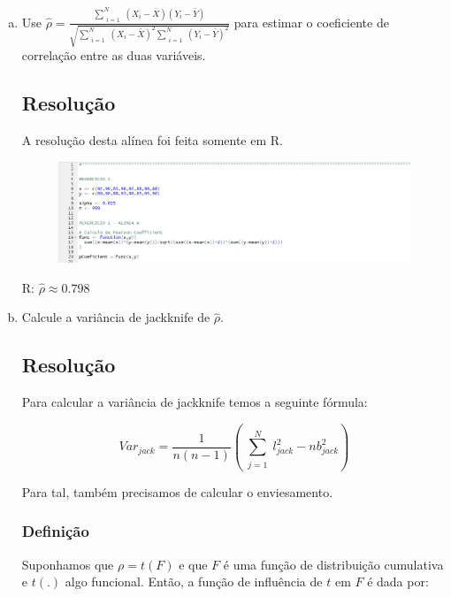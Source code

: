 \documentclass{article}
\begin{document}
			 \begin{enumerate}[(a)]
				\item Use $\hat{\rho} = 
				\frac{\sum_{\substack{i=1}}^{N} (X_i - \bar X)(Y_i - \bar Y)}										{\sqrt{\sum_{\substack{i=1}}^{N}(X_i - \bar X)^2 														\sum_{\substack{i=1}}^{N}(Y_i - \bar Y)^2}}$	
			para estimar o coeficiente de \indent \indent correlação entre as duas variáveis.
			
				\subsection*{Resolução}
					A resolução desta alínea foi feita somente em R.
					
					\begin{figure}[!h]
						\includegraphics[scale=0.70]{ex1a)}
					\end{figure}

				R: $\hat{\rho} \approx 0.798$
			
				\item Calcule a variância de jackknife de $\hat{\rho}$.
				
				\subsection*{Resolução}	
					Para calcular a variância de jackknife temos a seguinte fórmula:
					
					\begin{equation*}
						Var_{jack} = \frac{1}{n(n-1)}(\sum_{\substack{j=1}}^{N}
									l_{jack}^2 -nb_{jack}^2)
					\end{equation*}		
					
					Para tal, também precisamos de calcular o enviesamento.
					
					\subsubsection*{Definição}
						Suponhamos que	$\rho = t(F)$ e que $F$ é uma função	de distribuição cumulativa e $t(.)$ algo funcional. Então, a função de influência de $t$ em $F$ é dada por:
						

\end{enumerate}
\end{document}
